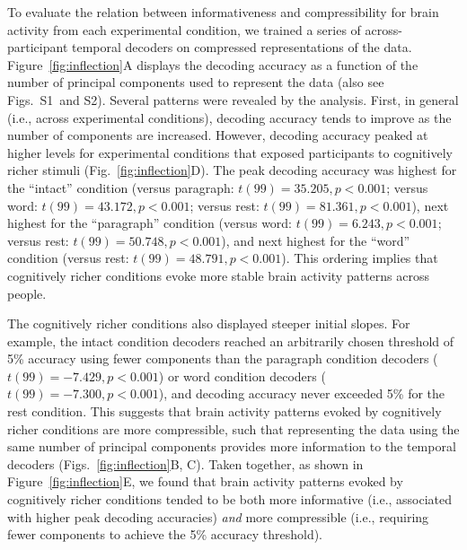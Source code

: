 \documentclass[english, 11pt]{article}
\newcommand{\autocorr}{S1}
\newcommand{\varExplained}{S2}
\begin{document}
To evaluate the relation between informativeness and compressibility for brain
activity from each experimental condition, we trained a series of
across-participant temporal decoders on compressed representations of the data.
Figure~\ref{fig:inflection}A displays the decoding accuracy as a function of
the number of principal components used to represent the data (also see
Figs.~\autocorr~and \varExplained). Several patterns were revealed by the analysis. First, in
general (i.e., across experimental conditions), decoding accuracy tends to
improve as the number of components are increased. However, decoding accuracy
peaked at higher levels for experimental conditions that exposed participants
to cognitively richer stimuli (Fig.~\ref{fig:inflection}D). The peak decoding
accuracy was highest for the ``intact'' condition (versus paragraph: $t(99) =
35.205, p < 0.001$; versus word: $t(99) = 43.172, p < 0.001$; versus rest:
$t(99) = 81.361, p < 0.001$), next highest for the ``paragraph'' condition
(versus word: $t(99) = 6.243, p < 0.001$; versus rest: $t(99) = 50.748, p <
0.001$), and next highest for the ``word'' condition (versus rest: $t(99) =
48.791, p < 0.001$). This ordering implies that cognitively richer conditions
evoke more stable brain activity patterns across people.

The cognitively richer conditions also displayed steeper initial slopes. For
example, the intact condition decoders reached an arbitrarily chosen threshold
of 5\% accuracy using fewer components than the paragraph condition decoders
($t(99) = -7.429, p < 0.001$) or word condition decoders ($t(99) = -7.300, p <
0.001$), and decoding accuracy never exceeded 5\% for the rest condition. This
suggests that brain activity patterns evoked by cognitively richer conditions
are more compressible, such that representing the data using the same number of
principal components provides more information to the temporal decoders
(Figs.~\ref{fig:inflection}B, C). Taken together, as shown in
Figure~\ref{fig:inflection}E, we found that brain activity patterns evoked by
cognitively richer conditions tended to be both more informative (i.e.,
associated with higher peak decoding accuracies) \textit{and} more compressible
(i.e., requiring fewer components to achieve the 5\% accuracy threshold).
\end{document}
